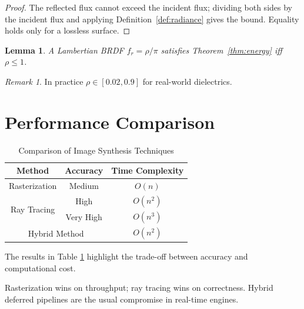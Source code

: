 \documentclass[11pt,a4paper]{article}
\theoremstyle{plain}
\newtheorem{lemma}[theorem]{Lemma}
\theoremstyle{definition}
\theoremstyle{remark}
\newtheorem*{remark}{Remark}
\begin{document}
\begin{proof}
The reflected flux cannot exceed the incident flux; dividing both sides by the
incident flux and applying Definition~\ref{def:radiance} gives the bound. Equality
holds only for a lossless surface.
\end{proof}

\begin{lemma}
A Lambertian BRDF $f_r = \rho/\pi$ satisfies Theorem~\ref{thm:energy} iff
$\rho \le 1$.
\end{lemma}

\begin{remark}
In practice $\rho \in [0.02, 0.9]$ for real-world dielectrics.
\end{remark}

\section{Performance Comparison}

\begin{table}[!h]
    \centering
    \begin{tabular}{|c|c|c|}
    \hline
         Method & Accuracy & Time Complexity  \\ \hline
         Rasterization & Medium & $O(n)$ \\ \hline
        \multirow{2}{2cm}{Ray Tracing} & High & $O(n^2)$ \\
        & Very High & $O(n^3)$ \\ \hline
        \multicolumn{2}{|c|}{Hybrid Method} & $O(n^2)$ \\ \hline
    \end{tabular}
    \caption{Comparison of Image Synthesis Techniques}
    \label{tab:comparison}
\end{table}

The results in Table \ref{tab:comparison} highlight the trade-off between accuracy and computational cost.

\begin{tcolorbox}[colback=blue!5!white, colframe=blue!60!black,
                  title=Takeaway (new: tcolorbox)]
Rasterization wins on throughput; ray tracing wins on correctness. Hybrid
deferred pipelines are the usual compromise in real-time engines.
\end{tcolorbox}

\clearpage
\end{document}
